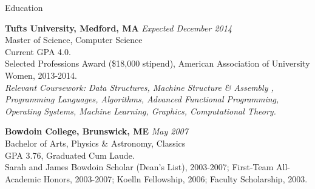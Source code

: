 \documentclass{resume} %
\begin{document}

\begin{rSection}{Education}

{\bf Tufts University, Medford, MA} \hfill {\em Expected December 2014} \\
Master of Science, Computer Science\\
Current GPA 4.0. \smallskip \\
Selected Professions Award (\$18,000 stipend), American Association of University Women, 2013-2014. \smallskip \\
{\em Relevant Coursework: Data Structures, Machine Structure \& Assembly , Programming Languages, Algorithms, Advanced Functional Programming, Operating Systems, Machine Learning, Graphics, Computational Theory.}
\smallskip

{\bf Bowdoin College, Brunswick, ME} \hfill {\em  May 2007} \\
Bachelor of Arts, Physics \& Astronomy, Classics \\
GPA 3.76, Graduated Cum Laude.  \smallskip \\
Sarah and James Bowdoin Scholar (Dean's List), 2003-2007; First-Team All-Academic Honors, 2003-2007; Koelln Fellowship, 2006; Faculty Scholarship, 2003. \\
\end{rSection}

\end{document}
